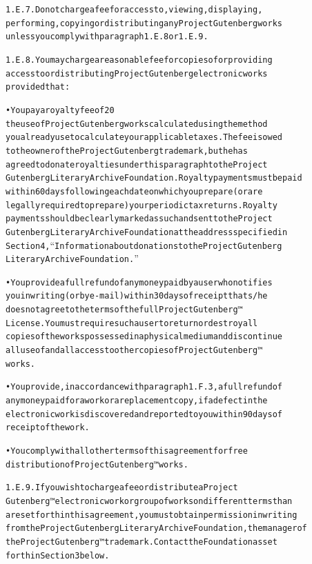 \documentclass[12pt]{book}[2005/09/16]
\newenvironment{PGtext}{%
\begin{alltt}
\fontsize{9.2}{10.5}\ttfamily\selectfont}%
{\end{alltt}}
\begin{document}
\begin{PGtext}
1.E.7. Do not charge a fee for access to, viewing, displaying,
performing, copying or distributing any Project Gutenberg works
unless you comply with paragraph 1.E.8 or 1.E.9.

1.E.8. You may charge a reasonable fee for copies of or providing
access to or distributing Project Gutenberg electronic works
provided that:

    • You pay a royalty fee of 20%
        the use of Project Gutenberg works calculated using the method
        you already use to calculate your applicable taxes. The fee is owed
        to the owner of the Project Gutenberg trademark, but he has
        agreed to donate royalties under this paragraph to the Project
        Gutenberg Literary Archive Foundation. Royalty payments must be paid
        within 60 days following each date on which you prepare (or are
        legally required to prepare) your periodic tax returns. Royalty
        payments should be clearly marked as such and sent to the Project
        Gutenberg Literary Archive Foundation at the address specified in
        Section 4, “Information about donations to the Project Gutenberg
        Literary Archive Foundation.”
    
    • You provide a full refund of any money paid by a user who notifies
        you in writing (or by e-mail) within 30 days of receipt that s/he
        does not agree to the terms of the full Project Gutenberg™
        License. You must require such a user to return or destroy all
        copies of the works possessed in a physical medium and discontinue
        all use of and all access to other copies of Project Gutenberg™
        works.
    
    • You provide, in accordance with paragraph 1.F.3, a full refund of
        any money paid for a work or a replacement copy, if a defect in the
        electronic work is discovered and reported to you within 90 days of
        receipt of the work.
    
    • You comply with all other terms of this agreement for free
        distribution of Project Gutenberg™ works.
    

1.E.9. If you wish to charge a fee or distribute a Project
Gutenberg™ electronic work or group of works on different terms than
are set forth in this agreement, you must obtain permission in writing
from the Project Gutenberg Literary Archive Foundation, the manager of
the Project Gutenberg™ trademark. Contact the Foundation as set
forth in Section 3 below.


\end{PGtext}
\end{document}
